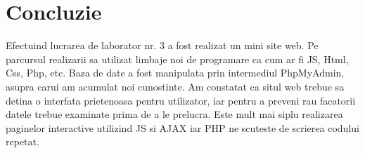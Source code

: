 \section*{Concluzie}
Efectuind lucrarea de laborator nr. 3 a fost realizat un mini site web. Pe parcursul realizarii sa utilizat limbaje noi de programare ca cum ar fi JS, Html, Css, Php, etc. 
Baza de date a fost manipulata prin intermediul PhpMyAdmin, asupra carui am acumulat noi cunostinte. Am constatat ca situl web trebue sa detina o interfata prietenoasa pentru utilizator, iar pentru a preveni rau facatorii datele trebue examinate prima de a le prelucra. Este mult mai siplu realizarea paginelor interactive utilizind JS si AJAX iar PHP ne scuteste de scrierea codului repetat.
\clearpage